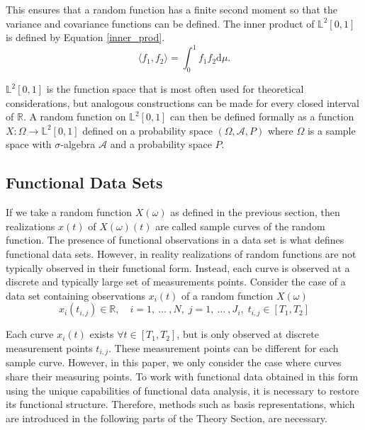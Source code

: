 \documentclass[11pt,twoside,a4paper]{article}
\begin{document}
	This ensures that a random function has a finite second moment so that the variance and covariance functions can be defined. The inner product of $\mathbb{L}^2[0,1]$ is defined by Equation \ref{inner_prod}.
	\begin{equation}\label{inner_prod}
		\langle f_1, f_2 \rangle = \int_{0}^{1} f_1 f_2 \mathrm{d}\mu.
	\end{equation}
	
	$\mathbb{L}^2[0,1]$ is the function space that is most often used for theoretical considerations, but analogous constructions can be made for every closed interval of $\mathbb{R}$. 
	A random function on $\mathbb{L}^2[0,1]$ can then be defined formally as a function $X : \Omega \rightarrow \mathbb{L}^2[0,1]$ defined on a probability space $(\Omega, \mathcal{A}, P)$ where $\Omega$ is a sample space with $\sigma$-algebra $\mathcal{A}$ and a probability space $P$.
	
	\subsection{Functional Data Sets}
	If we take a random function $X(\omega)$ as defined in the previous section, then realizations $x(t)$ of $X(\omega)(t)$ are called sample curves of the random function. The presence of functional observations in a data set is what defines functional data sets. However, in reality realizations of random functions are not typically observed in their functional form. Instead, each curve is observed at a discrete and typically large set of measurements points. Consider the case of a data set containing observations $x_i(t)$ of a random function $X(\omega)$
	\begin{equation}
		x_{i}(t_{i,j}) \in \mathbb{R}, \quad i = 1,\: \dots\: ,N, \; j = 1, \: \dots \:, J_i, \; t_{i,j} \in [T_1, T_2]
	\end{equation}
	
	Each curve $x_i(t)$ exists $\forall t \in [T_1, T_2]$, but is only observed at discrete measurement points $t_{i,j}$.  These measurement points can be different for each sample curve. However, in this paper, we only consider the case where curves share their measuring points.
	To work with functional data obtained in this form using the unique capabilities of functional data analysis, it is necessary to restore its functional structure. Therefore, methods such as basis representations, which are introduced in the following parts of the Theory Section, are necessary.\\
	
\end{document}
